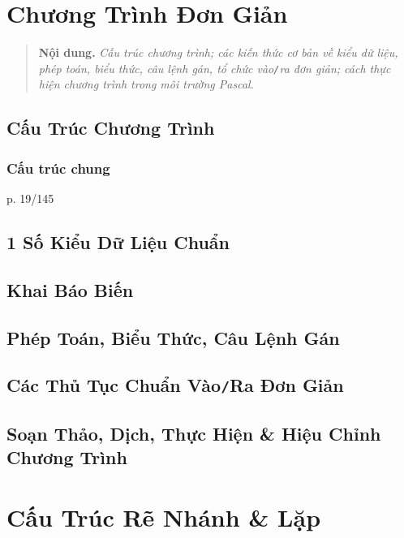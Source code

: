 \documentclass[oneside]{book}
\numberwithin{equation}{section}
\begin{document}

\chapter{Chương Trình Đơn Giản}

\begin{quotation}
	\textbf{Nội dung.} \textit{Cấu trúc chương trình; các kiến thức cơ bản về kiểu dữ liệu, phép toán, biểu thức, câu lệnh gán, tổ chức vào\emph{\texttt{/}}ra đơn giản; cách thực hiện chương trình trong môi trường Pascal}.
\end{quotation}

\section{Cấu Trúc Chương Trình}

\subsection{Cấu trúc chung}
p. 19/145

\section{1 Số Kiểu Dữ Liệu Chuẩn}

\section{Khai Báo Biến}

\section{Phép Toán, Biểu Thức, Câu Lệnh Gán}

\section{Các Thủ Tục Chuẩn Vào\texttt{/}Ra Đơn Giản}

\section{Soạn Thảo, Dịch, Thực Hiện \& Hiệu Chỉnh Chương Trình}


\chapter{Cấu Trúc Rẽ Nhánh \& Lặp}
\end{document}
